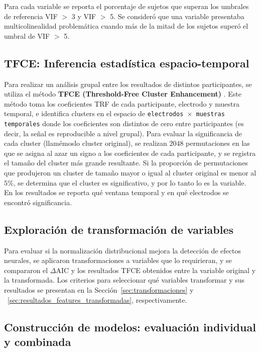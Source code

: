 Para cada variable se reporta el porcentaje de sujetos que superan los umbrales de
referencia VIF $>$ 3 y VIF $>$ 5. Se consideró que una variable presentaba multicolinealidad
problemática cuando más de la mitad de los sujetos superó el umbral de VIF $>$ 5.


\subsection{TFCE: Inferencia estadística espacio-temporal}

Para realizar un análisis grupal entre los resultados de distintos participantes, se utiliza el método \textbf{TFCE (Threshold-Free Cluster Enhancement)} \citep{mensen2013advanced}. Este método toma los coeficientes TRF de cada participante, electrodo y muestra temporal, e identifica clusters en el espacio de \texttt{electrodos $\times$ muestras temporales} donde los coeficientes son distintos de cero entre participantes (es decir, la señal es reproducible a nivel grupal). Para evaluar la significancia de cada cluster (llamémoslo cluster original), se realizan $2048$ permutaciones en las que se asigna al azar un signo a los coeficientes de cada participante, y se registra el tamaño del cluster más grande resultante. Si la proporción de permutaciones que produjeron un cluster de tamaño mayor o igual al cluster original es menor al $5\%$, se determina que el cluster es significativo, y por lo tanto lo es la variable. En los resultados se reporta qué ventana temporal y en qué electrodos se encontró significancia.

\subsection{Exploración de transformación de variables}

Para evaluar si la normalización distribucional mejora la detección de efectos neurales, se aplicaron transformaciones a variables que lo requirieran, y se compararon el $\Delta\mathrm{AIC}$ y los resultados TFCE obtenidos entre la variable original y la transformada. Los criterios para seleccionar qué variables transformar y sus resultados se presentan en la Sección~\ref{sec:transformaciones} y ~\ref{sec:resultados_features_transformadas}, respectivamente.

\subsection{Construcción de modelos: evaluación individual y combinada}

